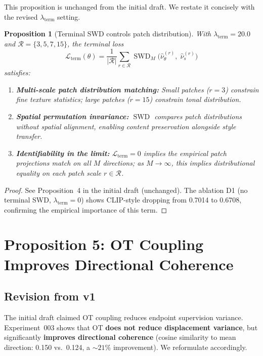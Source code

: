 \documentclass[letterpaper]{article}
\newtheorem{proposition}{Proposition}[section]
\newcommand{\SWD}{\operatorname{SWD}}
\newcommand{\cL}{\mathcal{L}}
\begin{document}
This proposition is unchanged from the initial draft. We restate it
concisely with the revised $\lambda_{\text{term}}$ setting.

\begin{proposition}[Terminal SWD controls patch distribution]
\label{prop:terminal_swd}
With $\lambda_{\text{term}}=20.0$ and $\mathcal{R}=\{3,5,7,15\}$,
the terminal loss
\begin{equation}
    \cL_{\text{term}}(\theta) = \frac{1}{|\mathcal{R}|}\sum_{r\in\mathcal{R}}
    \SWD_M\bigl( \hat\nu_\theta^{(r)},\; \hat\nu_s^{(r)} \bigr)
\end{equation}
satisfies:

\begin{enumerate}[nosep]
    \item \textbf{Multi-scale patch distribution matching:}
    Small patches ($r=3$) constrain fine texture statistics;
    large patches ($r=15$) constrain tonal distribution.
    
    \item \textbf{Spatial permutation invariance:}
    $\SWD$ compares patch \emph{distributions} without spatial alignment,
    enabling content preservation alongside style transfer.
    
    \item \textbf{Identifiability in the limit:}
    $\cL_{\text{term}}=0$ implies the empirical patch projections match
    on all $M$ directions; as $M\to\infty$, this implies distributional
    equality on each patch scale $r\in\mathcal{R}$.
\end{enumerate}
\end{proposition}

\begin{proof}
See Proposition~4 in the initial draft (unchanged).
The ablation D1 (no terminal SWD, $\lambda_{\text{term}}=0$) shows
CLIP-style dropping from 0.7014 to 0.6708, confirming the empirical
importance of this term.
\end{proof}


\section{Proposition 5: OT Coupling Improves Directional Coherence}

\subsection{Revision from v1}
The initial draft claimed OT coupling reduces endpoint supervision variance.
Experiment~003 shows that OT \textbf{does not reduce displacement variance},
but significantly \textbf{improves directional coherence} (cosine similarity
to mean direction: 0.150 vs.~0.124, a $\sim 21\%$ improvement).
We reformulate accordingly.
\end{document}
